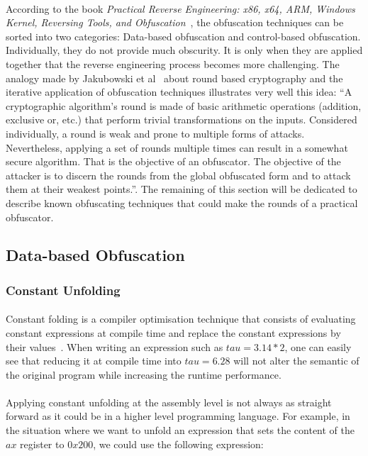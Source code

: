\paragraph{}
According to the book \textit{Practical Reverse Engineering: x86, x64, ARM, Windows Kernel, Reversing Tools, and Obfuscation}~\cite{Dang:2014:PRE:2636663}, the obfuscation techniques can be sorted into two categories: Data-based obfuscation and control-based obfuscation. Individually, they do not provide much obscurity. It is only when they are applied together that the reverse engineering process becomes more challenging. The analogy made by Jakubowski et al~\cite{jakubowski2009iterated} about round based cryptography and the iterative application of obfuscation techniques illustrates very well this idea: “A cryptographic algorithm's round is made of basic arithmetic operations (addition, exclusive or, etc.) that perform trivial transformations on the inputs. Considered individually, a round is weak and prone to multiple forms of attacks. Nevertheless, applying a set of rounds multiple times can result in a somewhat secure algorithm. That is the objective of an obfuscator. The objective of the attacker is to discern the rounds from the global obfuscated form and to attack them at their weakest points.”. The remaining of this section will be dedicated to describe known obfuscating techniques that could make the rounds of a practical obfuscator.

\subsection{Data-based Obfuscation}
\subsubsection{Constant Unfolding}
\paragraph{}
Constant folding is a compiler optimisation technique that consists of evaluating constant expressions at compile time and replace the constant expressions by their values~\cite{aho1986compilers}. When writing an expression such as $tau = 3.14 * 2$, one can easily see that reducing it at compile time into $tau = 6.28$ will not alter the semantic of the original program while increasing the runtime performance.

\paragraph{}
Applying constant unfolding at the assembly level is not always as straight forward as it could be in a higher level programming language. For example, in the situation where we want to unfold an expression that sets the content of the $ax$ register to $0x200$, we could use the following expression: \\


